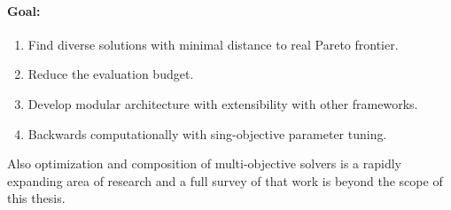        \paragraph{Goal:}
        \begin{enumerate}
            \item Find diverse solutions with minimal distance to real Pareto frontier.
            \item Reduce the evaluation budget.
            \item Develop modular architecture with extensibility with other frameworks. 
            \item Backwards computationally with sing-objective parameter tuning.
        \end{enumerate}

        Also optimization and composition of multi-objective solvers is a rapidly expanding area of research and a full survey of that work is beyond the scope of this thesis.



